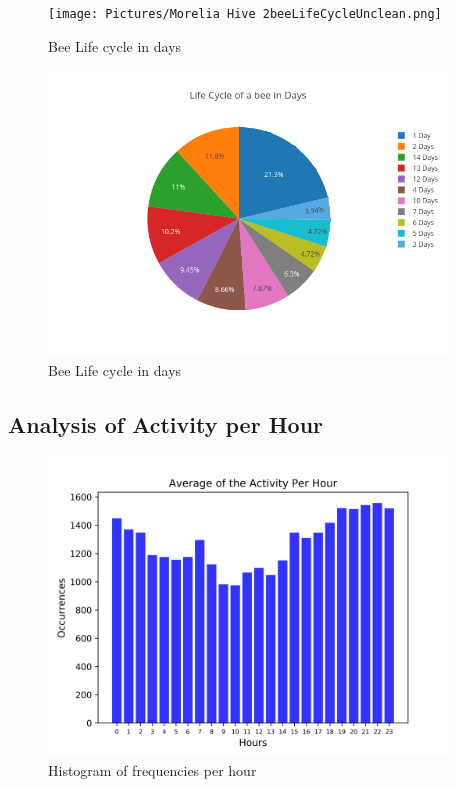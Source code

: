 \documentclass[11pt,fleqn]{book} %
\begin{document}
%


\begin{figure}[h!]%
\centering%
\texttt{[image: Pictures/Morelia Hive 2beeLifeCycleUnclean.png]}%
\caption{Bee Life cycle in days}%
\end{figure}

%


\begin{figure}[h!]%
\centering%
\includegraphics[width=400px]{Pictures/Morelia Hive 2pieBeeLifeCycleUnclean.png}%
\caption{Bee Life cycle in days}%
\end{figure}

%
\subsection{Analysis of Activity per Hour}%
\label{subsec:Analysis of Activity per Hour}%


\begin{figure}[h!]%
\centering%
\includegraphics[width=400px]{Pictures/Morelia Hive 2histogramUnclean.png}%
\caption{Histogram of frequencies per hour}%
\end{figure}
\end{document}
